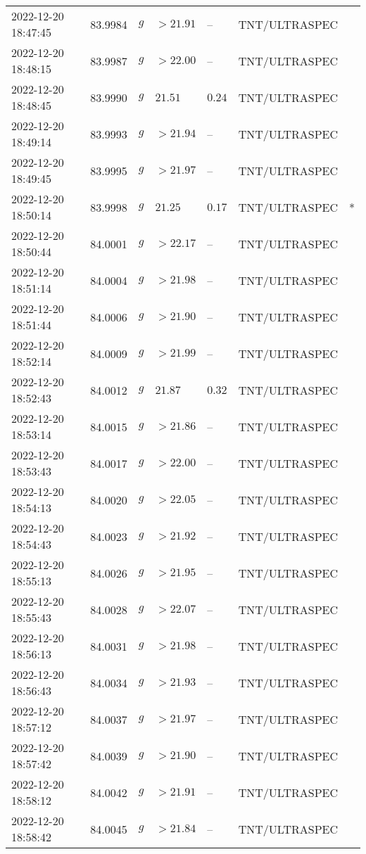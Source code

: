 \documentclass{nature_plusfigure}
\begin{document}
\begin{supplement}
\begin{center}
\begin{longtable}{lllllll}
2022-12-20 18:47:45 & 83.9984 & $g$ & $>21.91$ & -- & TNT/ULTRASPEC &  \\ 
2022-12-20 18:48:15 & 83.9987 & $g$ & $>22.00$ & -- & TNT/ULTRASPEC &  \\ 
2022-12-20 18:48:45 & 83.9990 & $g$ & $21.51$ & $0.24$ & TNT/ULTRASPEC &  \\ 
2022-12-20 18:49:14 & 83.9993 & $g$ & $>21.94$ & -- & TNT/ULTRASPEC &  \\ 
2022-12-20 18:49:45 & 83.9995 & $g$ & $>21.97$ & -- & TNT/ULTRASPEC &  \\ 
2022-12-20 18:50:14 & 83.9998 & $g$ & $21.25$ & $0.17$ & TNT/ULTRASPEC & * \\ 
2022-12-20 18:50:44 & 84.0001 & $g$ & $>22.17$ & -- & TNT/ULTRASPEC &  \\ 
2022-12-20 18:51:14 & 84.0004 & $g$ & $>21.98$ & -- & TNT/ULTRASPEC &  \\ 
2022-12-20 18:51:44 & 84.0006 & $g$ & $>21.90$ & -- & TNT/ULTRASPEC &  \\ 
2022-12-20 18:52:14 & 84.0009 & $g$ & $>21.99$ & -- & TNT/ULTRASPEC &  \\ 
2022-12-20 18:52:43 & 84.0012 & $g$ & $21.87$ & $0.32$ & TNT/ULTRASPEC &  \\ 
2022-12-20 18:53:14 & 84.0015 & $g$ & $>21.86$ & -- & TNT/ULTRASPEC &  \\ 
2022-12-20 18:53:43 & 84.0017 & $g$ & $>22.00$ & -- & TNT/ULTRASPEC &  \\ 
2022-12-20 18:54:13 & 84.0020 & $g$ & $>22.05$ & -- & TNT/ULTRASPEC &  \\ 
2022-12-20 18:54:43 & 84.0023 & $g$ & $>21.92$ & -- & TNT/ULTRASPEC &  \\ 
2022-12-20 18:55:13 & 84.0026 & $g$ & $>21.95$ & -- & TNT/ULTRASPEC &  \\ 
2022-12-20 18:55:43 & 84.0028 & $g$ & $>22.07$ & -- & TNT/ULTRASPEC &  \\ 
2022-12-20 18:56:13 & 84.0031 & $g$ & $>21.98$ & -- & TNT/ULTRASPEC &  \\ 
2022-12-20 18:56:43 & 84.0034 & $g$ & $>21.93$ & -- & TNT/ULTRASPEC &  \\ 
2022-12-20 18:57:12 & 84.0037 & $g$ & $>21.97$ & -- & TNT/ULTRASPEC &  \\ 
2022-12-20 18:57:42 & 84.0039 & $g$ & $>21.90$ & -- & TNT/ULTRASPEC &  \\ 
2022-12-20 18:58:12 & 84.0042 & $g$ & $>21.91$ & -- & TNT/ULTRASPEC &  \\ 
2022-12-20 18:58:42 & 84.0045 & $g$ & $>21.84$ & -- & TNT/ULTRASPEC &  \\ 

\end{longtable}
\end{center}
\end{supplement}
\end{document}
